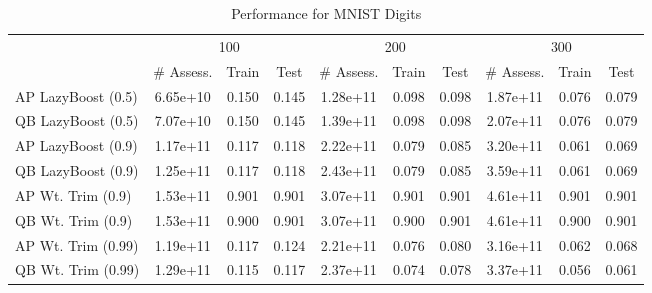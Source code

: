 \begin{table*}[ht]
\caption{Performance for MNIST Digits}
\label{tbl:perf-mnist}
\vskip 0.15in
\begin{center}
\begin{small}
\begin{sc}
\begin{tabular}{lccccccccc}
\toprule
	& \multicolumn{3}{c}{100}
	& \multicolumn{3}{c}{200}
	& \multicolumn{3}{c}{300}
	\\
 & \# Assess. & Train & Test & \# Assess. & Train & Test & \# Assess. & Train & Test \\
\midrule
AP LazyBoost (0.5) & 6.65e+10 & 0.150 & 0.145 & 1.28e+11 & 0.098 & 0.098 & 1.87e+11 & 0.076 & 0.079 \\
QB LazyBoost (0.5) & 7.07e+10 & 0.150 & 0.145 & 1.39e+11 & 0.098 & 0.098 & 2.07e+11 & 0.076 & 0.079 \\
AP LazyBoost (0.9) & 1.17e+11 & 0.117 & 0.118 & 2.22e+11 & 0.079 & 0.085 & 3.20e+11 & 0.061 & 0.069 \\
QB LazyBoost (0.9) & 1.25e+11 & 0.117 & 0.118 & 2.43e+11 & 0.079 & 0.085 & 3.59e+11 & 0.061 & 0.069 \\
AP Wt. Trim (0.9) & 1.53e+11 & 0.901 & 0.901 & 3.07e+11 & 0.901 & 0.901 & 4.61e+11 & 0.901 & 0.901 \\
QB Wt. Trim (0.9) & 1.53e+11 & 0.900 & 0.901 & 3.07e+11 & 0.900 & 0.901 & 4.61e+11 & 0.900 & 0.901 \\
AP Wt. Trim (0.99) & 1.19e+11 & 0.117 & 0.124 & 2.21e+11 & 0.076 & 0.080 & 3.16e+11 & 0.062 & 0.068 \\
QB Wt. Trim (0.99) & 1.29e+11 & 0.115 & 0.117 & 2.37e+11 & 0.074 & 0.078 & 3.37e+11 & 0.056 & 0.061 \\
\bottomrule
\end{tabular}
\end{sc}
\end{small}
\end{center}
\vskip -0.1in
\end{table*}


